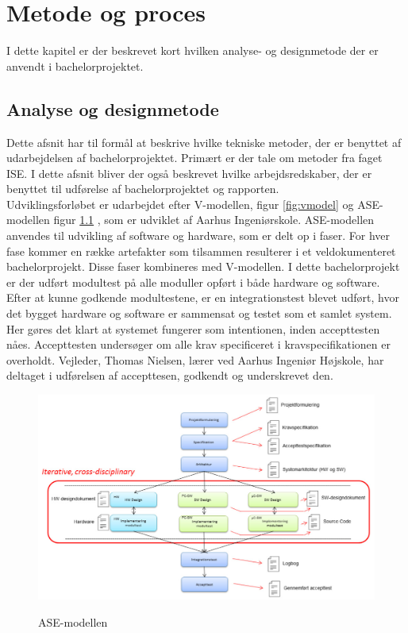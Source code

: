 \chapter{Metode og proces}

I dette kapitel er der beskrevet kort hvilken analyse- og designmetode der er anvendt i bachelorprojektet. 

\section{Analyse og designmetode}

Dette afsnit har til formål at beskrive hvilke tekniske metoder, der er benyttet af udarbejdelsen af bachelorprojektet. Primært er der tale om metoder fra faget ISE. I dette afsnit bliver der også beskrevet hvilke arbejdsredskaber, der er benyttet til udførelse af bachelorprojektet og rapporten.\\

Udviklingsforløbet er udarbejdet efter V-modellen, figur \ref{fig:vmodel} og ASE-modellen figur \ref{fig:asemodel} \cite{IngeniorhojskolenAarhusUniversiteta}, som er udviklet af Aarhus Ingeniørskole. ASE-modellen anvendes til udvikling af software og hardware, som er delt op i faser. For hver fase kommer en række artefakter som tilsammen resulterer i et veldokumenteret bachelorprojekt. Disse faser kombineres med V-modellen. I dette bachelorprojekt er der udført modultest på alle moduller opført i både hardware og software. Efter at kunne godkende modultestene, er en integrationstest blevet udført, hvor det bygget hardware og software er sammensat og testet som et samlet system. Her gøres det klart at systemet fungerer som intentionen, inden accepttesten nåes. Accepttesten undersøger om alle krav specificeret i kravspecifikationen er overholdt. Vejleder, Thomas Nielsen, lærer ved Aarhus Ingeniør Højskole, har deltaget i udførelsen af accepttesen, godkendt og underskrevet den. 

\begin{figure}[H]
\centering
{\includegraphics[width=\textwidth]
{Figure/asemodel}}
\caption{ASE-modellen\cite{IngeniorhojskolenAarhusUniversiteta}}
\label{fig:asemodel}
\end{figure}

